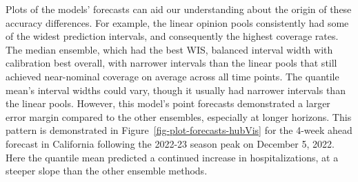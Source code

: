\documentclass[
]{article}
\begin{document}
Plots of the models' forecasts can aid our understanding about the
origin of these accuracy differences. For example, the linear opinion
pools consistently had some of the widest prediction intervals, and
consequently the highest coverage rates. The median ensemble, which had
the best WIS, balanced interval width with calibration best overall,
with narrower intervals than the linear pools that still achieved
near-nominal coverage on average across all time points. The quantile
mean's interval widths could vary, though it usually had narrower
intervals than the linear pools. However, this model's point forecasts
demonstrated a larger error margin compared to the other ensembles,
especially at longer horizons. This pattern is demonstrated in
Figure~\ref{fig-plot-forecasts-hubVis} for the 4-week ahead forecast in
California following the 2022-23 season peak on December 5, 2022. Here
the quantile mean predicted a continued increase in hospitalizations, at
a steeper slope than the other ensemble methods.
\end{document}
